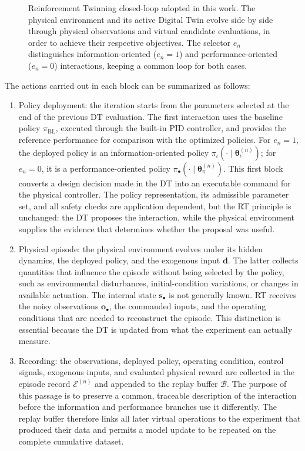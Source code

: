 \documentclass[journal]{IEEEtran}
\begin{document}
\begin{figure}[t]
{\begin{tikzpicture}
\end{tikzpicture}%
}
\caption{Reinforcement Twinning closed-loop adopted in this work. The physical environment and its active Digital Twin evolve side by side through physical observations and virtual candidate evaluations, in order to achieve their respective objectives. The selector $e_n$ distinguishes information-oriented ($e_n=1$) and performance-oriented ($e_n=0$) interactions, keeping a common loop for both cases.}
\label{fig:rt_framework}
\end{figure}
The actions carried out in each block can be summarized as follows:
\begin{enumerate}
    \item Policy deployment: the iteration starts from the parameters selected at the end of the previous DT evaluation. The first interaction uses the baseline policy $\pi_{\mathrm{BL}}$, executed through the built-in PID controller, and provides the reference performance for comparison with the optimized policies. For $e_n=1$, the deployed policy is an information-oriented policy $\pi_{\iota}(\cdot\mid\boldsymbol{\theta}_{\iota}^{(n)})$; for $e_n=0$, it is a performance-oriented policy $\pi_{\bullet}(\cdot\mid\boldsymbol{\theta}_{\pi}^{(n)})$. This first block converts a design decision made in the DT into an executable command for the physical controller. The policy representation, its admissible parameter set, and all safety checks are application dependent, but the RT principle is unchanged: the DT proposes the interaction, while the physical environment supplies the evidence that determines whether the proposal was useful.
    \item Physical episode: the physical environment evolves under its hidden dynamics, the deployed policy, and the exogenous input $\mathbf d$. The latter collects quantities that influence the episode without being selected by the policy, such as environmental disturbances, initial-condition variations, or changes in available actuation. The internal state $\mathbf s_{\bullet}$ is not generally known. RT receives the noisy observations $\mathbf o_{\bullet}$, the commanded inputs, and the operating conditions that are needed to reconstruct the episode. This distinction is essential because the DT is updated from what the experiment can actually measure.
    \item Recording: the observations, deployed policy, operating condition, control signals, exogenous inputs, and evaluated physical reward are collected in the episode record $\mathcal E^{(n)}$ and appended to the replay buffer $\mathcal B$. The purpose of this passage is to preserve a common, traceable description of the interaction before the information and performance branches use it differently. The replay buffer therefore links all later virtual operations to the experiment that produced their data and permits a model update to be repeated on the complete cumulative dataset.

\end{enumerate}
\end{document}
